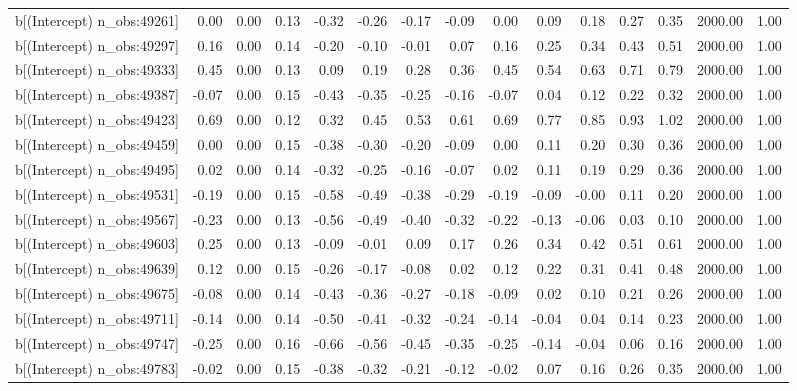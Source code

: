 \begin{table}[ht]
\begin{tabular}{rrrrrrrrrrrrrrr}
  b[(Intercept) n\_obs:49261] & 0.00 & 0.00 & 0.13 & -0.32 & -0.26 & -0.17 & -0.09 & 0.00 & 0.09 & 0.18 & 0.27 & 0.35 & 2000.00 & 1.00 \\ 
  b[(Intercept) n\_obs:49297] & 0.16 & 0.00 & 0.14 & -0.20 & -0.10 & -0.01 & 0.07 & 0.16 & 0.25 & 0.34 & 0.43 & 0.51 & 2000.00 & 1.00 \\ 
  b[(Intercept) n\_obs:49333] & 0.45 & 0.00 & 0.13 & 0.09 & 0.19 & 0.28 & 0.36 & 0.45 & 0.54 & 0.63 & 0.71 & 0.79 & 2000.00 & 1.00 \\ 
  b[(Intercept) n\_obs:49387] & -0.07 & 0.00 & 0.15 & -0.43 & -0.35 & -0.25 & -0.16 & -0.07 & 0.04 & 0.12 & 0.22 & 0.32 & 2000.00 & 1.00 \\ 
  b[(Intercept) n\_obs:49423] & 0.69 & 0.00 & 0.12 & 0.32 & 0.45 & 0.53 & 0.61 & 0.69 & 0.77 & 0.85 & 0.93 & 1.02 & 2000.00 & 1.00 \\ 
  b[(Intercept) n\_obs:49459] & 0.00 & 0.00 & 0.15 & -0.38 & -0.30 & -0.20 & -0.09 & 0.00 & 0.11 & 0.20 & 0.30 & 0.36 & 2000.00 & 1.00 \\ 
  b[(Intercept) n\_obs:49495] & 0.02 & 0.00 & 0.14 & -0.32 & -0.25 & -0.16 & -0.07 & 0.02 & 0.11 & 0.19 & 0.29 & 0.36 & 2000.00 & 1.00 \\ 
  b[(Intercept) n\_obs:49531] & -0.19 & 0.00 & 0.15 & -0.58 & -0.49 & -0.38 & -0.29 & -0.19 & -0.09 & -0.00 & 0.11 & 0.20 & 2000.00 & 1.00 \\ 
  b[(Intercept) n\_obs:49567] & -0.23 & 0.00 & 0.13 & -0.56 & -0.49 & -0.40 & -0.32 & -0.22 & -0.13 & -0.06 & 0.03 & 0.10 & 2000.00 & 1.00 \\ 
  b[(Intercept) n\_obs:49603] & 0.25 & 0.00 & 0.13 & -0.09 & -0.01 & 0.09 & 0.17 & 0.26 & 0.34 & 0.42 & 0.51 & 0.61 & 2000.00 & 1.00 \\ 
  b[(Intercept) n\_obs:49639] & 0.12 & 0.00 & 0.15 & -0.26 & -0.17 & -0.08 & 0.02 & 0.12 & 0.22 & 0.31 & 0.41 & 0.48 & 2000.00 & 1.00 \\ 
  b[(Intercept) n\_obs:49675] & -0.08 & 0.00 & 0.14 & -0.43 & -0.36 & -0.27 & -0.18 & -0.09 & 0.02 & 0.10 & 0.21 & 0.26 & 2000.00 & 1.00 \\ 
  b[(Intercept) n\_obs:49711] & -0.14 & 0.00 & 0.14 & -0.50 & -0.41 & -0.32 & -0.24 & -0.14 & -0.04 & 0.04 & 0.14 & 0.23 & 2000.00 & 1.00 \\ 
  b[(Intercept) n\_obs:49747] & -0.25 & 0.00 & 0.16 & -0.66 & -0.56 & -0.45 & -0.35 & -0.25 & -0.14 & -0.04 & 0.06 & 0.16 & 2000.00 & 1.00 \\ 
  b[(Intercept) n\_obs:49783] & -0.02 & 0.00 & 0.15 & -0.38 & -0.32 & -0.21 & -0.12 & -0.02 & 0.07 & 0.16 & 0.26 & 0.35 & 2000.00 & 1.00 \\ 

\end{tabular}
\end{table}
